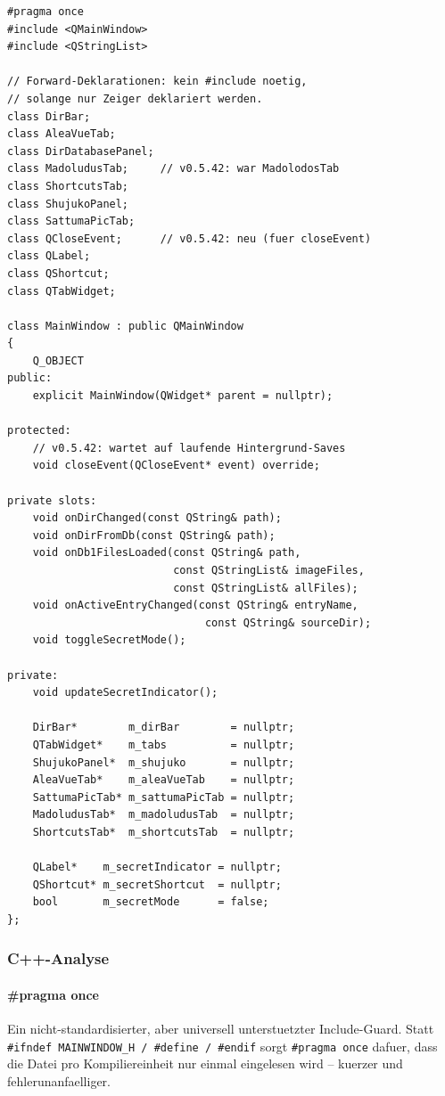 \begin{lstlisting}[style=header, caption={mainwindow.h -- vollstaendige Deklaration}]
#pragma once
#include <QMainWindow>
#include <QStringList>

// Forward-Deklarationen: kein #include noetig,
// solange nur Zeiger deklariert werden.
class DirBar;
class AleaVueTab;
class DirDatabasePanel;
class MadoludusTab;     // v0.5.42: war MadolodosTab
class ShortcutsTab;
class ShujukoPanel;
class SattumaPicTab;
class QCloseEvent;      // v0.5.42: neu (fuer closeEvent)
class QLabel;
class QShortcut;
class QTabWidget;

class MainWindow : public QMainWindow
{
    Q_OBJECT
public:
    explicit MainWindow(QWidget* parent = nullptr);

protected:
    // v0.5.42: wartet auf laufende Hintergrund-Saves
    void closeEvent(QCloseEvent* event) override;

private slots:
    void onDirChanged(const QString& path);
    void onDirFromDb(const QString& path);
    void onDb1FilesLoaded(const QString& path,
                          const QStringList& imageFiles,
                          const QStringList& allFiles);
    void onActiveEntryChanged(const QString& entryName,
                               const QString& sourceDir);
    void toggleSecretMode();

private:
    void updateSecretIndicator();

    DirBar*        m_dirBar        = nullptr;
    QTabWidget*    m_tabs          = nullptr;
    ShujukoPanel*  m_shujuko       = nullptr;
    AleaVueTab*    m_aleaVueTab    = nullptr;
    SattumaPicTab* m_sattumaPicTab = nullptr;
    MadoludusTab*  m_madoludusTab  = nullptr;
    ShortcutsTab*  m_shortcutsTab  = nullptr;

    QLabel*    m_secretIndicator = nullptr;
    QShortcut* m_secretShortcut  = nullptr;
    bool       m_secretMode      = false;
};
\end{lstlisting}

\subsubsection{C++-Analyse}

\paragraph{\#pragma once}
Ein nicht-standardisierter, aber universell unterstuetzter
Include-Guard. Statt
\verb|#ifndef MAINWINDOW_H / #define / #endif|
sorgt \verb|#pragma once| dafuer, dass die Datei pro
Kompiliereinheit nur einmal eingelesen wird -- kuerzer und
fehlerunanfaelliger.

